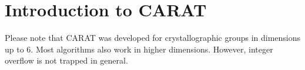 \section{Introduction to CARAT}

Please note that CARAT was developed for crystallographic groups in dimensions
up to 6. Most algorithms also work in higher dimensions.
However, integer overflow is not trapped in general.

